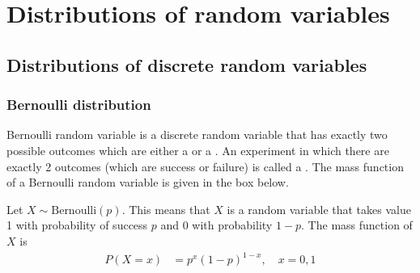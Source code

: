 \chapter{Distributions of random variables}
\label{sectionDistributionsOfRandomVariables}

\section{Distributions of discrete random variables}


\subsection{Bernoulli distribution}
\label{sectionBernouli}



Bernoulli random variable is a discrete random variable that has exactly two possible outcomes
which are either a  or a .
An experiment in which there are exactly 2 outcomes (which are success or failure)
is called a .
The mass function of a Bernoulli random variable is given in the box below.


\begin{termBox}{
Let $X \sim \text{Bernoulli}(p)$. 
This means that  $X$ is a random variable that takes value 1 with probability of success $p$ and 0 with probability $1-p$.
The mass function of $X$ is
\begin{align}
P(X = x) & = p^{x}(1-p)^{1-x}, \quad x = 0, 1
\end{align}
}
\end{termBox}

